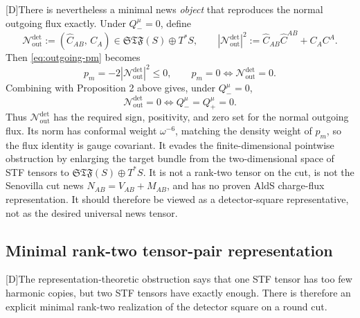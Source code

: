 \documentclass[11pt,a4paper]{article}
\newcommand{\cN}{\mathcal{N}}
\newcommand{\statusD}{\textsf{[D]}}
\begin{document}
\statusD There is nevertheless a minimal news \emph{object} that reproduces the normal outgoing flux exactly.  Under \(Q_-^\mu=0\), define
\begin{equation}\label{eq:detector-news-pair}
  \cN^{\mathrm{det}}_{\mathrm{out}}
  :=
  (\hat C_{AB},\,C_A)
  \in
  \mathfrak{STF}(S)\oplus T^*S ,
  \qquad
  |\cN^{\mathrm{det}}_{\mathrm{out}}|^2
  :=
  \hat C_{AB}\hat C^{AB}+C_A C^A .
\end{equation}
Then \eqref{eq:outgoing-pm} becomes
\begin{equation}
  p_m=-2|\cN^{\mathrm{det}}_{\mathrm{out}}|^2\le0,
  \qquad
  p_m=0\iff \cN^{\mathrm{det}}_{\mathrm{out}}=0 .
\end{equation}
Combining with Proposition 2 above gives, under \(Q_-^\mu=0\),
\begin{equation}
  \cN^{\mathrm{det}}_{\mathrm{out}}=0
  \iff
  Q_-^\mu=Q_+^\mu=0 .
\end{equation}
Thus \(\cN^{\mathrm{det}}_{\mathrm{out}}\) has the required sign, positivity, and zero set for the normal outgoing flux.  Its norm has conformal weight \(\omega^{-6}\), matching the density weight of \(p_m\), so the flux identity is gauge covariant.  It evades the finite-dimensional pointwise obstruction by enlarging the target bundle from the two-dimensional space of STF tensors to \(\mathfrak{STF}(S)\oplus T^*S\).  It is not a rank-two tensor on the cut, is not the Senovilla cut news \(N_{AB}=V_{AB}+M_{AB}\), and has no proven AldS charge-flux representation.  It should therefore be viewed as a detector-square representative, not as the desired universal news tensor.

\subsection{Minimal rank-two tensor-pair representation}

\statusD The representation-theoretic obstruction says that one STF tensor has too few harmonic copies, but two STF tensors have exactly enough.  There is therefore an explicit minimal rank-two realization of the detector square on a round cut.
\end{document}
